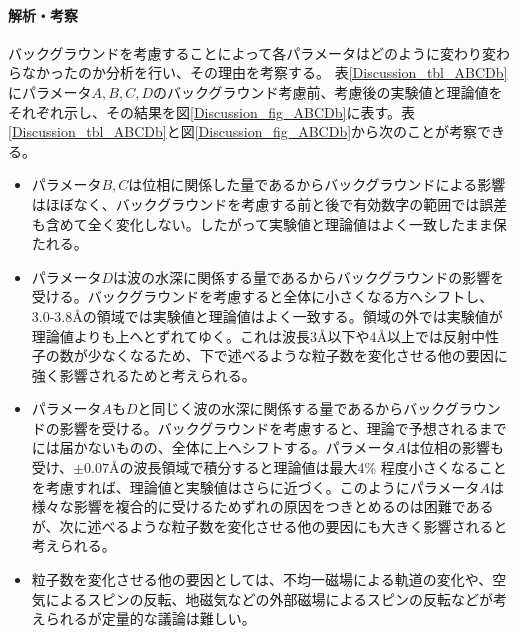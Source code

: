 \paragraph{解析・考察}
バックグラウンドを考慮することによって各パラメータはどのように変わり変わらなかったのか分析を行い、その理由を考察する。
表\ref{Discussion_tbl_ABCDb}にパラメータ$A, B, C, D$のバックグラウンド考慮前、考慮後の実験値と理論値をそれぞれ示し、その結果を図\ref{Discussion_fig_ABCDb}に表す。表\ref{Discussion_tbl_ABCDb}と図\ref{Discussion_fig_ABCDb}から次のことが考察できる。
\begin{itemize}
\item パラメータ$B, C$は位相に関係した量であるからバックグラウンドによる影響はほぼなく、バックグラウンドを考慮する前と後で有効数字の範囲では誤差も含めて全く変化しない。したがって実験値と理論値はよく一致したまま保たれる。
\item パラメータ$D$は波の水深に関係する量であるからバックグラウンドの影響を受ける。バックグラウンドを考慮すると全体に小さくなる方へシフトし、3.0-3.8\AA の領域では実験値と理論値はよく一致する。領域の外では実験値が理論値よりも上へとずれてゆく。これは波長3\AA 以下や4\AA 以上では反射中性子の数が少なくなるため、下で述べるような粒子数を変化させる他の要因に強く影響されるためと考えられる。
\item パラメータ$A$も$D$と同じく波の水深に関係する量であるからバックグラウンドの影響を受ける。バックグラウンドを考慮すると、理論で予想されるまでには届かないものの、全体に上へシフトする。パラメータ$A$は位相の影響も受け、$\pm 0.07$\AA の波長領域で積分すると理論値は最大4\% 程度小さくなることを考慮すれば、理論値と実験値はさらに近づく。このようにパラメータ$A$は様々な影響を複合的に受けるためずれの原因をつきとめるのは困難であるが、次に述べるような粒子数を変化させる他の要因にも大きく影響されると考えられる。
\item 粒子数を変化させる他の要因としては、不均一磁場による軌道の変化や、空気によるスピンの反転、地磁気などの外部磁場によるスピンの反転などが考えられるが定量的な議論は難しい。
\end{itemize}

